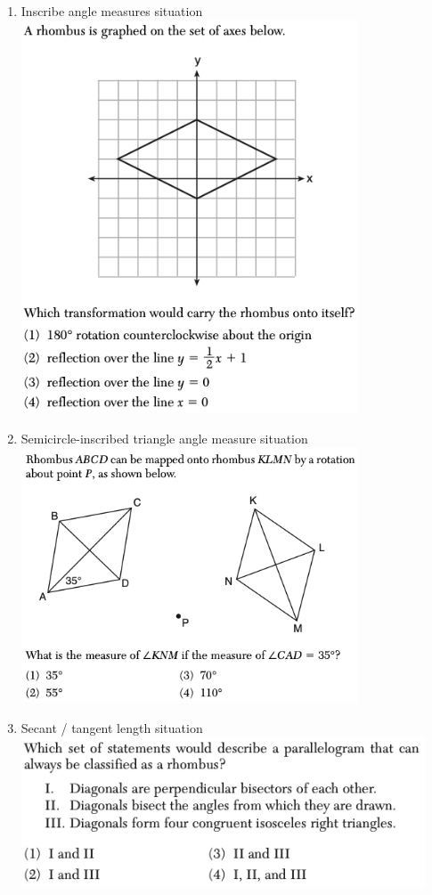 \documentclass[12pt, oneside]{article}
\begin{document}
\begin{enumerate}
\item Inscribe angle measures situation\\
\includegraphics[width=10cm]{R-4images/R-4RhombusJ.png}
\vspace{1cm}

\item Semicircle-inscribed triangle angle measure situation\\
\includegraphics[width=10cm]{R-4images/R-4RhombusK.png}
\vspace{1cm}

\newpage
\item Secant / tangent length situation\\
\includegraphics[width=12cm]{R-4images/R-4RhombusA.png}
\vspace{2cm}


\end{enumerate}
\end{document}
